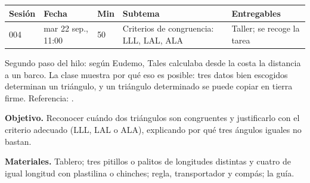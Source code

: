 \documentclass[11pt]{article}
\begin{document}
\encabezado*

\begin{center}
{\renewcommand{\arraystretch}{1.3}
\begin{tabularx}{\linewidth}{@{}l l l X l@{}}
  \toprule
  \textbf{Sesión} & \textbf{Fecha} & \textbf{Min} & \textbf{Subtema} & \textbf{Entregables}\\
  \midrule
  004 & mar 22 sep., 11:00 & 50 & Criterios de congruencia: LLL, LAL, ALA
      & Taller; se recoge la tarea\\
  \bottomrule
\end{tabularx}}
\end{center}

Segundo paso del hilo: según Eudemo, Tales calculaba desde la costa la distancia a un barco.
La clase muestra por qué eso es posible: tres datos bien escogidos determinan un triángulo,
y un triángulo determinado se puede copiar en tierra firme.
Referencia: .


\textbf{Objetivo.} Reconocer cuándo dos triángulos son congruentes y justificarlo con el
criterio adecuado (LLL, LAL o ALA), explicando por qué tres ángulos iguales no bastan.

\textbf{Materiales.} Tablero; tres pitillos o palitos de longitudes distintas y cuatro de
igual longitud con plastilina o chinches; regla, transportador y compás; la guía.
\end{document}
